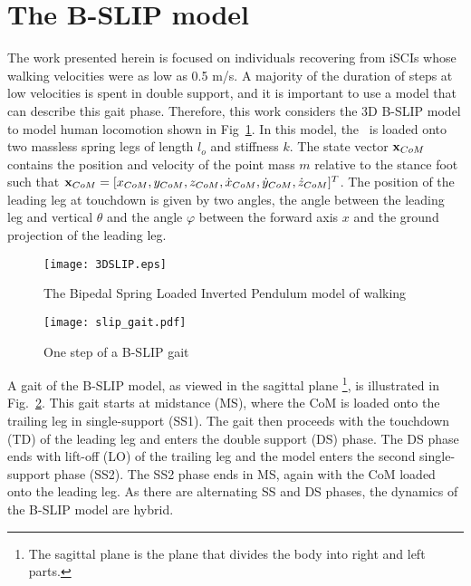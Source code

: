 \section{The B-SLIP model}\label{sec:bslip_model}
The work presented herein is focused on individuals recovering from iSCIs whose walking velocities were as low as 0.5 m/s. A majority of the duration of steps at low velocities is spent in double support, and it is important to use a model that can describe this gait phase. Therefore, this work considers the 3D B-SLIP model to model human locomotion shown in Fig~\ref{fig:slip}. In this model, the \COM~is loaded onto two massless spring legs of length $ l_o $ and stiffness $ k $. The state vector $ \mathbf{x}_{CoM} $ contains the position and velocity of the point mass $ m $ relative to the stance foot such that $ \mathbf{x}_{CoM} = [x_{CoM} ,y_{CoM} ,z_{CoM} ,\dot{x}_{CoM} ,\dot{y}_{CoM} ,\dot{z}_{CoM}]^T $. The position of the leading leg at touchdown is given by two angles, the angle between the leading leg and vertical $ \theta $ and the angle $ \varphi $ between the forward axis $ x $  and the ground projection of the leading leg.
%
\begin{figure}
	\centering
	\texttt{[image: 3DSLIP.eps]}
	\caption{The Bipedal Spring Loaded Inverted Pendulum \cite{liu2015dynamic} model of walking}\label{fig:slip}
\end{figure}
%
\begin{figure}
	\centering
	\texttt{[image: slip\_gait.pdf]}
	\caption{One step of a B-SLIP gait}\label{fig:slip_gait}
\end{figure} 
%

A gait of the B-SLIP model, as viewed in the sagittal plane \footnote{The sagittal plane is the plane that divides the body into right and left parts.}, is illustrated in Fig.~\ref{fig:slip_gait}. This gait starts at midstance (MS), where the CoM is loaded onto the trailing leg in single-support (SS1). The gait then proceeds with the touchdown (TD) of the leading leg and enters the double support (DS) phase. The DS phase ends with lift-off (LO) of the trailing leg and the model enters the second single-support phase (SS2). The SS2 phase ends in MS, again with the CoM loaded onto the leading leg. As there are alternating SS and DS phases, the dynamics of the B-SLIP model are hybrid.

